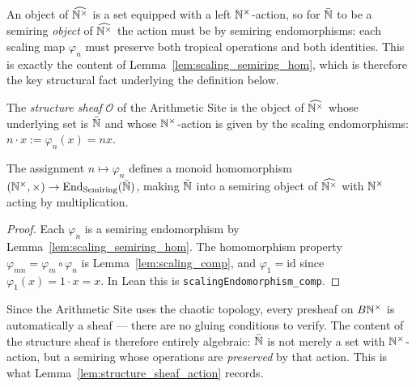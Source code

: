 An object of $\widehat{\mathbb{N}^{\times}}$ is a set equipped with a left
$\mathbb{N}^{\times}$-action, so for $\bar{\mathbb{N}}$ to be a semiring \emph{object} of
$\widehat{\mathbb{N}^{\times}}$ the action must be by semiring endomorphisms: each
scaling map $\varphi_n$ must preserve both tropical operations and both
identities.  This is exactly the content of
Lemma~\ref{lem:scaling_semiring_hom}, which is therefore the key
structural fact underlying the definition below.

\begin{definition}[label=def:structure_sheaf,
                  uses=def:presheaf_topos, def:Nbar, def:scaling_action]
  \label{def:structure_sheaf}
  The \emph{structure sheaf} $\mathcal{O}$ of the Arithmetic Site is the
  object of $\widehat{\mathbb{N}^{\times}}$ whose underlying set is $\bar{\mathbb{N}}$ and whose
  $\mathbb{N}^{\times}$-action is given by the scaling endomorphisms:
  $n \cdot x := \varphi_n(x) = nx$.
\end{definition}

\begin{lemma}[label=lem:structure_sheaf_action,
             uses=def:structure_sheaf, lem:scaling_comp, lem:scaling_semiring_hom]
  \label{lem:structure_sheaf_action}\leanok
  The assignment $n \mapsto \varphi_n$ defines a monoid homomorphism
  $(\mathbb{N}^{\times}, \times) \to \mathrm{End}_{\mathrm{Semiring}}(\bar{\mathbb{N}})$,
  making $\bar{\mathbb{N}}$ into a semiring object of $\widehat{\mathbb{N}^{\times}}$ with
  $\mathbb{N}^{\times}$ acting by multiplication.
\end{lemma}
\begin{proof}
  Each $\varphi_n$ is a semiring endomorphism by
  Lemma~\ref{lem:scaling_semiring_hom}.  The homomorphism property
  $\varphi_{mn} = \varphi_m \circ \varphi_n$ is
  Lemma~\ref{lem:scaling_comp}, and $\varphi_1 = \mathrm{id}$ since
  $\varphi_1(x) = 1 \cdot x = x$.  In Lean this is
  \texttt{scalingEndomorphism\_comp}.
\end{proof}

\begin{remark}
  Since the Arithmetic Site uses the chaotic topology, every presheaf on
  $B\mathbb{N}^{\times}$ is automatically a sheaf --- there are no gluing conditions
  to verify.  The content of the structure sheaf is therefore entirely
  algebraic: $\bar{\mathbb{N}}$ is not merely a set with $\mathbb{N}^{\times}$-action, but a
  semiring whose operations are \emph{preserved} by that action.  This
  is what Lemma~\ref{lem:structure_sheaf_action} records.
\end{remark}

